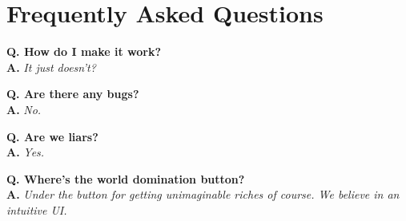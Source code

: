 \section{Frequently Asked Questions}

\newcommand{\faqentry}[2]{\textbf{Q. #1}\\  \textbf{A.} \textit{#2}\vspace{0.5cm}}


\faqentry{How do I make it work?}{It just doesn't?}

\faqentry{Are there any bugs?}{No.}

\faqentry{Are we liars?}{Yes.}

\faqentry{Where's the world domination button?}{Under the button for getting unimaginable riches of course. We believe in an intuitive UI.}